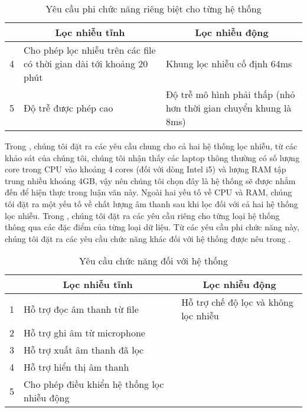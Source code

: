 			\begin{table}[h]
				\centering
				\begin{tabular}{c p{60mm} p{60mm}}
					\hline
					& \multicolumn{1}{c}{\textbf{Lọc nhiễu tĩnh}}	& \multicolumn{1}{c}{\textbf{Lọc nhiễu động}} \\
					\hline
					4	& Cho phép lọc nhiễu trên các file có thời gian dài tới khoảng 20 phút 	& Khung lọc nhiễu cố định 64ms \\
					5	& Độ trễ được phép cao		& Độ trễ mô hình phải thấp (nhỏ hơn thời gian chuyển khung là 8ms) \\
					\hline
				\end{tabular}
				\caption{Yêu cầu phi chức năng riêng biệt cho từng hệ thống}
				\label{design::non_functional_req_excluded}
			\end{table}
		
		 Trong , chúng tôi đặt ra các yêu cầu chung cho cả hai hệ thống lọc nhiễu, từ các khảo sát của chúng tôi, chúng tôi nhận thấy các laptop thông thường có số lượng core trong CPU vào khoảng 4 cores (đối với dòng Intel i5) và lượng RAM tập trung nhiều khoảng 4GB, vậy nên chúng tôi chọn đây là hệ thống sẽ được nhắm đến để hiện thực trong luận văn này. Ngoài hai yếu tố về CPU và RAM, chúng tôi đặt ra một yếu tố về chất lượng âm thanh sau khi lọc đối với cả hai hệ thống lọc nhiễu. Trong , chúng tôi đặt ra các yêu cầu riêng cho từng loại hệ thống thông qua các đặc điểm của từng loại dữ liệu. Từ các yêu cầu phi chức năng này, chúng tôi đặt ra các yêu cầu chức năng khác đối với hệ thống được nêu trong .
			
			\begin{table}[h]
				\centering
				\begin{tabular}{c p{60mm} p{60mm}}
					\hline
					& \multicolumn{1}{c}{\textbf{Lọc nhiễu tĩnh}}		& \multicolumn{1}{c}{\textbf{Lọc nhiễu động}} \\
					\hline
					1	& Hỗ trợ đọc âm thanh từ file					& Hỗ trợ chế độ lọc và không lọc nhiễu \\
					2	& Hỗ trợ ghi âm từ microphone					& \\
					3	& Hỗ trợ xuất âm thanh đã lọc					& \\
					4	& Hỗ trợ hiển thị âm thanh						& \\
					5	& Cho phép điều khiển hệ thống lọc nhiễu động	& \\
					\hline
				\end{tabular}
				\caption{Yêu cầu chức năng đối với hệ thống}
				\label{design::functional_req}
			\end{table}
		
